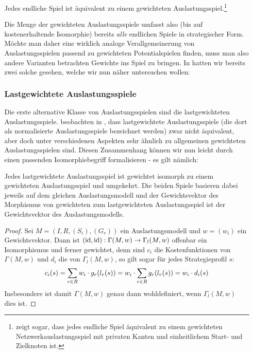 \begin{satz}\label{satz:JedesSpielGewAusl}
	Jedes endliche Spiel ist äquivalent zu einem gewichteten Auslastungsspiel.\footnote{\citeauthor{ReprOfFiniteGamesAsNCG} zeigt sogar, dass jedes endliche Spiel äquivalent zu einem gewichteten Netzwerkauslastungsspiel mit privaten Kanten und einheitlichem Start- und Zielknoten ist.}
\end{satz}

Die Menge der gewichteten Auslastungsspiele umfasst also (bis auf kostenerhaltende Isomorphie) bereits \emph{alle} endlichen Spiele in strategischer Form. Möchte man daher eine wirklich analoge Verallgemeinerung von Auslastungsspielen passend zu gewichteten Potentialspielen finden, muss man also andere Varianten betrachten Gewichte ins Spiel zu bringen. In  hatten wir bereits zwei solche gesehen, welche wir nun näher untersuchen wollen:

\subsubsection{Lastgewichtete Auslastungsspiele}

Die erste alternative Klasse von Auslastungsspielen sind die lastgewichteten Auslastungsspiele. \citeauthor{CharExGewPotinWCG} beobachten in \cite[S. 53]{CharExGewPotinWCG}, dass lastgewichtete Auslastungsspiele (die dort als normalisierte Auslastungsspiele bezeichnet werden) zwar nicht äquivalent, aber doch unter verschiedenen Aspekten sehr ähnlich zu allgemeinen gewichteten Auslastungsspielen sind. Diesen Zusammenhang können wir nun leicht durch einen passenden Isomorphiebegriff formalisieren - es gilt nämlich:

\begin{lemma}\label{lemma:lastgewAuslIsomGewAusl}
	Jedes lastgewichtete Auslastungsspiel ist gewichtet isomorph zu einem gewichteten Auslastungsspiel und umgekehrt. Die beiden Spiele basieren dabei jeweils auf dem gleichen Auslastungsmodell und der Gewichtsvektor des Morphismus von gewichteten zum lastgewichteten Auslastungsspiel ist der Gewichtsvektor des Auslastungsmodells.
\end{lemma}

\begin{proof}
	Sei $M = (I, R, (S_i), (G_r))$ ein Auslastungsmodell und $w = (w_i)$ ein Gewichtsvektor. Dann ist $(\mathrm{id}, \mathrm{id}): \Gamma(M, w) \to \Gamma_l(M,w)$ offenbar ein Isomorphismus und ferner gewichtet, denn sind $c_i$ die Kostenfunktionen von $\Gamma(M, w)$ und $d_i$ die von $\Gamma_l(M,w)$, so gilt sogar für jedes Strategieprofil $s$:
		\[c_i(s) = \sum_{r \in R} w_i\cdot g_r(l_r(s)) = w_i \cdot \sum_{r \in R} g_r(l_r(s)) = w_i \cdot d_i(s) \qedhere\]
	Insbesondere ist damit $\Gamma(M, w)$ genau dann wohldefiniert, wenn $\Gamma_l(M, w)$ dies ist.
\end{proof}

